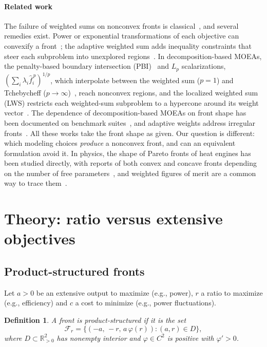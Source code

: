 \documentclass[journal]{IEEEtran}
\newtheorem{definition}{Definition}
\theoremstyle{remark}
\begin{document}
\paragraph*{Related work} The failure of weighted sums on nonconvex fronts is classical~\cite{DasDennis1997,Marler2004},
and several remedies exist. Power or exponential transformations of each objective can convexify a
front~\cite{Li1996}; the adaptive weighted sum adds inequality constraints that steer each subproblem
into unexplored regions~\cite{KimDeWeck2005}. In decomposition-based MOEAs, the penalty-based boundary
intersection (PBI)~\cite{ZhangLi2007} and $L_p$ scalarizations, $(\sum_i \lambda_i \hat f_i^{\,p})^{1/p}$,
which interpolate between the weighted sum ($p = 1$) and Tchebycheff ($p \to \infty$)~\cite{Giagkiozis2015,WangPaS2016},
reach nonconvex regions, and the localized weighted sum (LWS) restricts each weighted-sum subproblem to
a hypercone around its weight vector~\cite{WangLWS2018}. The dependence of decomposition-based MOEAs on
front shape has been documented on benchmark suites~\cite{Ishibuchi2017}, and adaptive weights address
irregular fronts~\cite{Qi2014,Trivedi2017}. All these works take the front shape as given. Our question is
different: which modeling choices \emph{produce} a nonconvex front, and can an equivalent formulation
avoid it. In physics, the shape of Pareto fronts of heat engines has been studied directly, with
reports of both convex and concave fronts depending on the number of free
parameters~\cite{Forao2025}, and weighted figures of merit are a common way to trace them~\cite{Erdman2023}.

\section{Theory: ratio versus extensive objectives}
\label{sec:theory}

\subsection{Product-structured fronts}

Let $a > 0$ be an extensive output to maximize (e.g., power), $r$ a ratio to maximize (e.g.,
efficiency) and $c$ a cost to minimize (e.g., power fluctuations).

\begin{definition}
A front is \emph{product-structured} if it is the set
\begin{equation}
\mathcal{F}_r = \{(-a,\,-r,\,a\,\varphi(r)) : (a,r) \in D\},
\label{eq:product}
\end{equation}
where $D \subset \mathbb{R}^2_{>0}$ has nonempty interior and $\varphi \in C^2$ is positive with
$\varphi' > 0$.
\end{definition}
\end{document}
